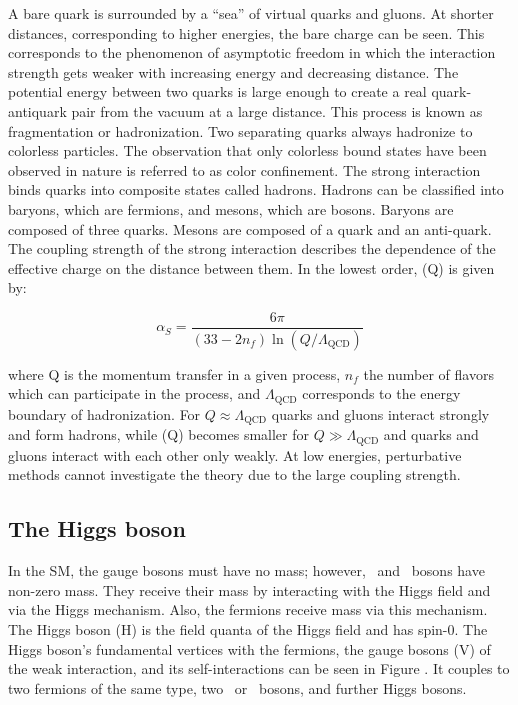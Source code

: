 A bare quark is surrounded by a ``sea'' of virtual quarks and gluons. At shorter distances, corresponding to higher energies, the bare charge can be seen. This corresponds to the phenomenon of asymptotic freedom in which the interaction strength gets weaker with increasing energy and decreasing distance. The potential energy between two quarks is large enough to create a real quark-antiquark pair from the vacuum at a large distance. This process is known as fragmentation or hadronization. Two separating quarks always hadronize to colorless particles. The observation that only colorless bound states have been observed in nature is referred to as color confinement. The strong interaction binds quarks into composite states called hadrons. Hadrons can be classified into baryons, which are fermions, and mesons, which are bosons. Baryons are composed of three quarks. Mesons are composed of a quark and an anti-quark. The coupling strength of the strong interaction \as describes the dependence of the effective charge on the distance between them. In the lowest order, \as(Q) is given by:

\begin{equation}
  \alpha_{S}=\frac{6 \pi}{(33-2 n_{f}) \ln (Q / \Lambda_{\mathrm{QCD}})}
\end{equation}

where Q is the momentum transfer in a given process, $n_{f}$ the number of flavors which can participate in the process, and $\Lambda_{\mathrm{QCD}}$ corresponds to the energy boundary of hadronization. For $Q \approx \Lambda_{\mathrm{QCD}}$ quarks and gluons interact strongly and form hadrons, while \as(Q) becomes smaller for $Q \gg \Lambda_{\mathrm{QCD}}$ and quarks and gluons interact with each other only weakly. At low energies, perturbative methods cannot investigate the theory due to the large coupling strength.

\subsection{The Higgs boson}
In the SM, the gauge bosons must have no mass; however, \PW\, and \PZ\, bosons have non-zero mass. They receive their mass by interacting with the Higgs field and via the Higgs mechanism. Also, the fermions receive mass via this mechanism. The Higgs boson (H) is the field quanta of the Higgs field and has spin-0. The Higgs boson's fundamental vertices with the fermions, the gauge bosons (V) of the weak interaction, and its self-interactions can be seen in Figure \cite{fig:h_vertices}. It couples to two fermions of the same type, two \PW\, or \PZ\, bosons, and further Higgs bosons.


